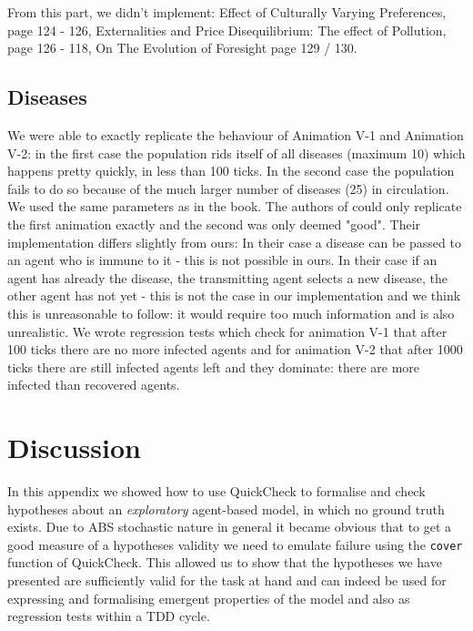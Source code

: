 From this part, we didn't implement: Effect of Culturally Varying Preferences, page 124 - 126, Externalities and Price Disequilibrium: The effect of Pollution, page 126 - 118, On The Evolution of Foresight page 129 / 130. 


\subsection{Diseases}
We were able to exactly replicate the behaviour of Animation V-1 and Animation V-2: in the first case the population rids itself of all diseases (maximum 10) which happens pretty quickly, in less than 100 ticks. In the second case the population fails to do so because of the much larger number of diseases (25) in circulation. We used the same parameters as in the book. 
The authors of \cite{weaver_replicating_2009} could only replicate the first animation exactly and the second was only deemed "good". Their implementation differs slightly from ours: In their case a disease can be passed to an agent who is immune to it - this is not possible in ours. In their case if an agent has already the disease, the transmitting agent selects a new disease, the other agent has not yet - this is not the case in our implementation and we think this is unreasonable to follow: it would require too much information and is also unrealistic.
We wrote regression tests which check for animation V-1 that after 100 ticks there are no more infected agents and for animation V-2 that after 1000 ticks there are still infected agents left and they dominate: there are more infected than recovered agents.

\section{Discussion}
In this appendix we showed how to use QuickCheck to formalise and check hypotheses about an \textit{exploratory} agent-based model, in which no ground truth exists. Due to ABS stochastic nature in general it became obvious that to get a good measure of a hypotheses validity we need to emulate failure using the \texttt{cover} function of QuickCheck. This allowed us to show that the hypotheses we have presented are sufficiently valid for the task at hand and can indeed be used for expressing and formalising emergent properties of the model and also as regression tests within a TDD cycle.


